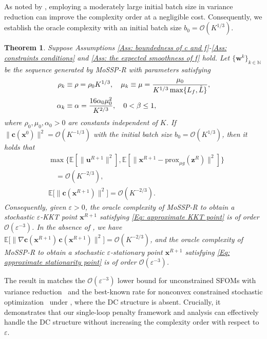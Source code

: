 \documentclass{article}
\theoremstyle{plain}
\newtheorem{theorem}{Theorem}[section]
\theoremstyle{definition}
\theoremstyle{remark}
\newcommand{\EE}{\mathbb{E}}
\newcommand{\NN}{\mathbb{N}}
\newcommand{\prox}{\mathrm{prox}}
\newcommand{\bx}{\bm{x}}
\newcommand{\bc}{\bm{c}}
\newcommand{\bu}{\bm{u}}
\newcommand{\bz}{\bm{z}}
\newcommand{\calO}{\mathcal{O}}
\newcommand{\bw}{\bm{w}}
\numberwithin{equation}{section}
\begin{document}
As noted by \citet{xu2023momentum}, employing a moderately large initial batch size in variance reduction can improve the complexity order at a negligible cost. Consequently, we
establish the oracle complexity with an initial batch size $b_0 = \calO(K^{1/3})$.
\begin{theorem}
    \label{Theorem: the convergence rate of storm with initial feasibility}
Suppose Assumptions \ref{Ass: boundedness of c and f}-\ref{Ass: constraints conditions} and \ref{Ass: the expected smoothness of f} hold. Let $\{\bw^k\}_{k \in \NN}$ be the sequence generated by MoSSP-R with parameters satisfying
\begin{align}
\rho_{k} &\equiv \rho = {\rho_0} K^{1/3}, \quad \mu_{k} \equiv \mu= \frac{\mu_0}{K^{1/3}\max\{L_f, \tilde{L}\}},\notag \\
\alpha_{k} &\equiv \alpha =\frac{16\alpha_0 \mu_0^{2}}{K^{2/3}},
\quad 0 < \beta \leq 1,
\label{Eq: the parameter conditions in VR for theorem}
\end{align}
where $\rho_0, \mu_0, \alpha_0 > 0$ are constants independent of $K$. If $\| \bc (\bx^{0}) \|^{2}= \calO(K^{-1/3})$ with the initial batch size $b_0 = \calO(K^{1/3})$, then it holds that
\begin{equation}
\begin{aligned}
&\max\bigl\{ \EE[\|\bu^{R+1}\|^{2}],
\EE[\|\bx^{R+1}-\prox_{\mu g}(\bz^{R})\|^{2}] \bigr\} \\
&\quad = \calO(K^{-2/3}), \\
&\EE\bigl[\|\bc(\bx^{R+1})\|^{2}\bigr]
= \calO(K^{-2/3}).
\end{aligned}
    \end{equation}
Consequently, given $\varepsilon > 0$, the oracle complexity of MoSSP-R to obtain a stochastic $\varepsilon$-KKT point $\bx^{R+1}$ satisfying \eqref{Eq: approximate KKT point} is of order $\calO(\varepsilon^{-3})$. In the absence of , we have $\EE\bigl[\|\nabla \bc(\bx^{R+1})\,\bc(\bx^{R+1})\|^{2}\bigr] = \calO(K^{-2/3})$, and the oracle complexity of MoSSP-R to obtain a stochastic $\varepsilon$-stationary point $\bx^{R+1}$ satisfying \eqref{Eq: approximate stationarity point} is of order $\calO(\varepsilon^{-3})$.
\end{theorem}

The result in  matches the $\calO(\varepsilon^{-3})$ lower bound for unconstrained SFOMs with variance reduction~\cite{arjevani2023lower} and the best-known rate for nonconvex constrained stochastic optimization~\cite{shi2025momentum} under , where the DC structure is absent. Crucially, it demonstrates that our single-loop penalty framework and analysis can effectively handle the DC structure without increasing the complexity order with respect to \(\varepsilon\). 
\end{document}
